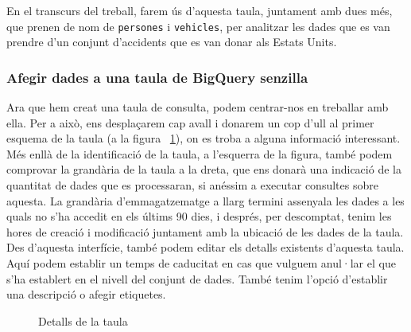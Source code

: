 \documentclass[12pt,longbibliography]{article}
\theoremstyle{definition}
\theoremstyle{remark}
\begin{document}
\vspace{2mm}

En el transcurs del treball, farem ús d'aquesta taula, juntament amb dues més, que prenen de nom de \verb|persones| i \verb|vehicles|, per analitzar les dades que es van prendre d'un conjunt d'accidents que es van donar als Estats Units. 

\subsubsection{Afegir dades a una taula de BigQuery senzilla}

Ara que hem creat una taula de consulta, podem centrar-nos en treballar amb ella. Per a això, ens desplaçarem cap avall i donarem un cop d'ull al primer esquema de la taula (a la figura ~\ref{fig:bq9}), on es troba a alguna informació interessant. Més enllà de la identificació de la taula, a l'esquerra de la figura, també podem comprovar la grandària de la taula a la dreta, que ens donarà una indicació de la quantitat de dades que es processaran, si anéssim a executar consultes sobre aquesta. La grandària d'emmagatzematge a llarg termini assenyala les dades a les quals no s'ha accedit en els últims 90 dies, i després, per descomptat, tenim les hores de creació i modificació juntament amb la ubicació de les dades de la taula. Des d'aquesta interfície, també podem editar els detalls existents d'aquesta taula. Aquí podem establir un temps de caducitat en cas que vulguem anul·lar el que s'ha establert en el nivell del conjunt de dades. També tenim l'opció d'establir una descripció o afegir etiquetes.

\vspace{2mm}
\begin{figure}[h!]
\par
{}%
\hfill
{}%
\par

\caption{Detalls de la taula}
\label{fig:bq9}
\end{figure}
\vspace{2mm}
\end{document}
